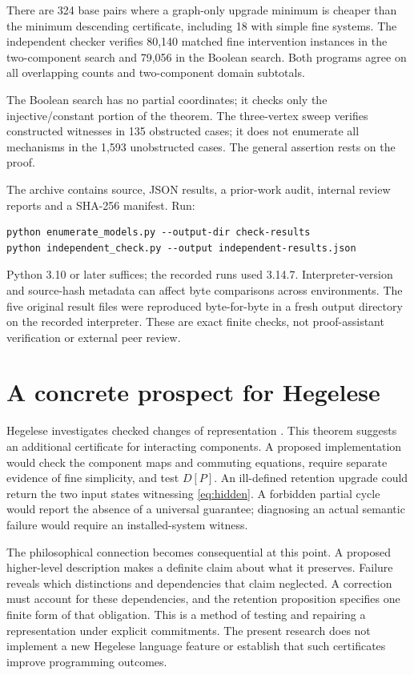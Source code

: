 \documentclass[11pt,a4paper]{article}
\theoremstyle{definition}
\theoremstyle{remark}
\begin{document}
There are 324 base pairs where a graph-only upgrade minimum is cheaper than the minimum descending certificate, including 18 with simple fine systems. The independent checker verifies 80,140 matched fine intervention instances in the two-component search and 79,056 in the Boolean search. Both programs agree on all overlapping counts and two-component domain subtotals.

The Boolean search has no partial coordinates; it checks only the injective/constant portion of the theorem. The three-vertex sweep verifies constructed witnesses in 135 obstructed cases; it does not enumerate all mechanisms in the 1,593 unobstructed cases. The general assertion rests on the proof.

The archive contains source, JSON results, a prior-work audit, internal review reports and a SHA-256 manifest. Run:
\begin{verbatim}
python enumerate_models.py --output-dir check-results
python independent_check.py --output independent-results.json
\end{verbatim}
Python 3.10 or later suffices; the recorded runs used 3.14.7. Interpreter-version and source-hash metadata can affect byte comparisons across environments. The five original result files were reproduced byte-for-byte in a fresh output directory on the recorded interpreter. These are exact finite checks, not proof-assistant verification or external peer review.

\section{A concrete prospect for Hegelese}

Hegelese investigates checked changes of representation \cite{hegelese}. This theorem suggests an additional certificate for interacting components. A proposed implementation would check the component maps and commuting equations, require separate evidence of fine simplicity, and test $D[P]$. An ill-defined retention upgrade could return the two input states witnessing \eqref{eq:hidden}. A forbidden partial cycle would report the absence of a universal guarantee; diagnosing an actual semantic failure would require an installed-system witness.

The philosophical connection becomes consequential at this point. A proposed higher-level description makes a definite claim about what it preserves. Failure reveals which distinctions and dependencies that claim neglected. A correction must account for these dependencies, and the retention proposition specifies one finite form of that obligation. This is a method of testing and repairing a representation under explicit commitments. The present research does not implement a new Hegelese language feature or establish that such certificates improve programming outcomes.
\end{document}
